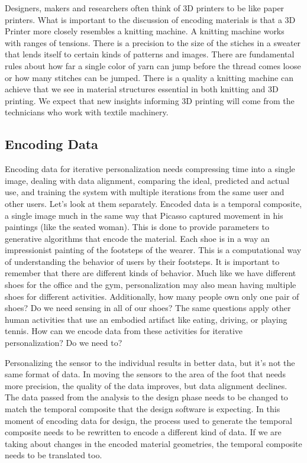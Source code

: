 Designers, makers and researchers often think of 3D printers to be like paper printers. What is important to the discussion of encoding materials is that a 3D Printer more closely resembles a knitting machine. A knitting machine works with ranges of tensions. There is a precision to the size of the stiches in a sweater that lends itself to certain kinds of patterns and images. There are fundamental rules about how far a single color of yarn can jump before the thread comes loose or how many stitches can be jumped. There is a quality a knitting machine can achieve that we see in material structures essential in both knitting and 3D printing. We expect that new insights informing 3D printing will come from the technicians who work with textile machinery.

\subsection{Encoding Data}

Encoding data for iterative personalization needs compressing time into a single image, dealing with data alignment, comparing the ideal, predicted and actual use, and training the system with multiple iterations from the same user and other users. Let’s look at them separately. Encoded data is a temporal composite, a single image much in the same way that Picasso captured movement in his paintings (like the seated woman). This is done to provide parameters to generative algorithms that encode the material. Each shoe is in a way an impressionist painting of the footsteps of the wearer. This is a computational way of understanding the behavior of users by their footsteps. It is important to remember that there are different kinds of behavior. Much like we have different shoes for the office and the gym, personalization may also mean having multiple shoes for different activities. Additionally, how many people own only one pair of shoes? Do we need sensing in all of our shoes? The same questions apply other human activities that use an embodied artifact like eating, driving, or playing tennis. How can we encode data from these activities for iterative personalization? Do we need to?

Personalizing the sensor to the individual results in better data, but it's not the same format of data. In moving the sensors to the area of the foot that needs more precision, the quality of the data improves, but data alignment declines. The data passed from the analysis to the design phase needs to be changed to match the temporal composite that the design software is expecting.  In this moment of encoding data for design, the process used to generate the temporal composite needs to be rewritten to encode a different kind of data. If we are taking about changes in the encoded material geometries, the temporal composite needs to be translated too. 

